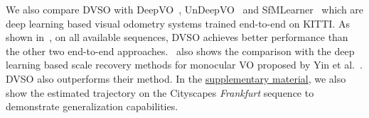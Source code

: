 \documentclass[runningheads]{llncs}
\begin{document}
We also compare DVSO with DeepVO~\cite{wang2017deepvo}, UnDeepVO~\cite{li2017undeepvo} 
and SfMLearner~\cite{zhou2017unsupervised} which are  
deep learning based visual odometry systems trained end-to-end on KITTI. As shown 
in~, on all available sequences, DVSO achieves better performance than the other two end-to-end 
approaches.~ also shows the comparison 
with the deep learning based scale recovery methods for monocular VO proposed by 
Yin et al.~\cite{yin2017scale}. DVSO also outperforms their method.
In the 
\href{https://vision.in.tum.de/_media/spezial/bib/yang2018dvso-supp.pdf}{supplementary
	material}, we also show the estimated trajectory on the 
Cityscapes \textit{Frankfurt} sequence to demonstrate generalization 
capabilities.

	\centering
	\tiny
	\setlength{\tabcolsep}{0em}
\end{document}
